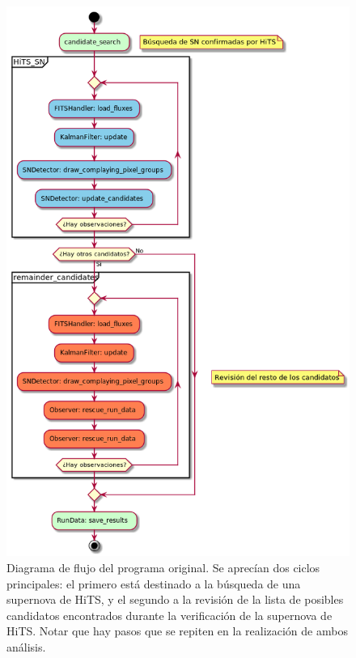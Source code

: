 \begin{figure}[h!]
\centering
\includegraphics[scale=.5]{images/results/sif_act}
\caption{Diagrama de flujo del programa original. Se aprec\'ian dos ciclos principales: el primero est\'a destinado a la b\'usqueda de una supernova de HiTS, y el segundo a la revisi\'on de la lista de posibles candidatos encontrados durante la verificaci\'on de la supernova de HiTS. Notar que hay pasos que se repiten en la realizaci\'on de ambos an\'alisis.}
\label{fig:des_sif}
\end{figure}

